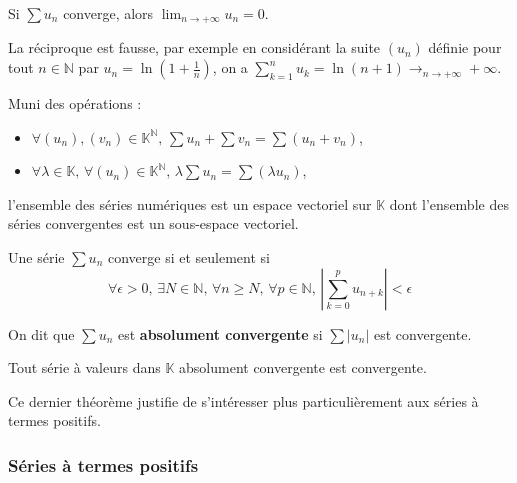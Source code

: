 
	\begin{proposition}
		Si $\sum u_n$ converge, alors $\lim_{n \rightarrow +\infty} u_n = 0$.
	\end{proposition}

	\begin{cexample}
		La réciproque est fausse, par exemple en considérant la suite $(u_n)$ définie pour tout $n \in \mathbb{N}$ par $u_n = \ln(1 + \frac{1}{n})$, on a $\sum_{k=1}^{n} u_k = \ln(n+1) \longrightarrow_{n \rightarrow +\infty} +\infty$.
	\end{cexample}

	\begin{proposition}
		Muni des opérations :
		\begin{itemize}
			\item $\forall (u_n), (v_n) \in \mathbb{K}^{\mathbb{N}}, \, \sum u_n + \sum v_n = \sum (u_n + v_n)$,
			\item $\forall \lambda \in \mathbb{K}, \, \forall (u_n) \in \mathbb{K}^{\mathbb{N}}, \, \lambda \sum u_n = \sum (\lambda u_n)$,
		\end{itemize}
		l'ensemble des séries numériques est un espace vectoriel sur $\mathbb{K}$ dont l'ensemble des séries convergentes est un sous-espace vectoriel.
	\end{proposition}


	\begin{proposition}
		Une série $\sum u_n$ converge si et seulement si
		\[ \forall \epsilon > 0, \, \exists N \in \mathbb{N}, \, \forall n \geq N, \, \forall p \in \mathbb{N}, \, \left| \sum_{k=0}^{p} u_{n+k} \right| < \epsilon \]
	\end{proposition}

	\begin{definition}
		On dit que $\sum u_n$ est \textbf{absolument convergente} si $\sum |u_n|$ est convergente.
	\end{definition}

	\begin{theorem}
		Tout série à valeurs dans $\mathbb{K}$ absolument convergente est convergente.
	\end{theorem}

	Ce dernier théorème justifie de s'intéresser plus particulièrement aux séries à termes positifs.

	\subsubsection{Séries à termes positifs}


